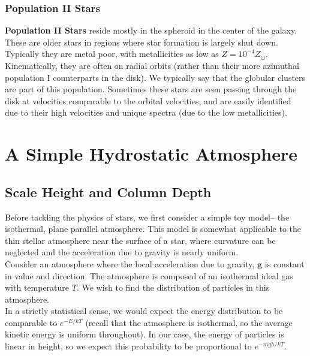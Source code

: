 \documentclass[10pt]{article}
\numberwithin{equation}{section}
\newcommand{\n}{\noindent}
\begin{document}
	\subsubsection{Population II Stars}
	 \textbf{Population II Stars} reside mostly in the spheroid in the center of the galaxy. These are older stars in regions where star formation is largely shut down. Typically they are metal poor, with metallicities as low as $Z=10^{-4}Z_\odot$. Kinematically, they are often on radial orbits (rather than their more azimuthal population I counterparts in the disk). We typically say that the globular clusters are part of this population. Sometimes these stars are seen passing through the disk at velocities comparable to the orbital velocities, and are easily identified due to their high velocities and unique spectra (due to the low metallicities).


\section{A Simple Hydrostatic Atmosphere}
	 \subsection{Scale Height and Column Depth}
	 Before tackling the physics of stars, we first consider a simple toy model-- the isothermal, plane parallel atmosphere. This model is somewhat applicable to the thin stellar atmosphere near the surface of a star, where curvature can be neglected and the acceleration due to gravity is nearly uniform.\\
	 
	 \n Consider an atmosphere where the local acceleration due to gravity, $\mathbf{g}$ is constant in value and direction. The atmosphere is composed of an isothermal ideal gas with temperature $T$. We wish to find the distribution of particles in this atmosphere.\\
	 
	 \n In a strictly statistical sense, we would expect the energy distribution to be comparable to $e^{-E/kT}$ (recall that the atmosphere is isothermal, so the average kinetic energy is uniform throughout). In our case, the energy of particles is linear in height, so we expect this probability to be proportional to $e^{-mgh/kT}$.\\
	 
\end{document}
